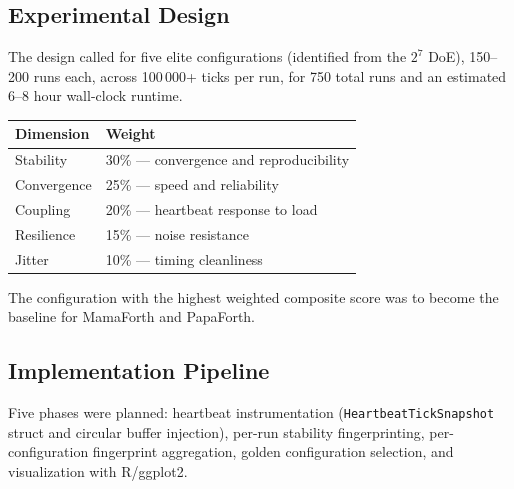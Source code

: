 \subsection{Experimental Design}

The design called for five elite configurations (identified from the
$2^7$ DoE), 150--200 runs each, across 100\,000+ ticks per run, for
750 total runs and an estimated 6--8 hour wall-clock runtime.

\begin{center}
\begin{tabular}{lp{6cm}}
\toprule
Dimension & Weight \\
\midrule
Stability   & 30\% — convergence and reproducibility \\
Convergence & 25\% — speed and reliability \\
Coupling    & 20\% — heartbeat response to load \\
Resilience  & 15\% — noise resistance \\
Jitter      & 10\% — timing cleanliness \\
\bottomrule
\end{tabular}
\end{center}

The configuration with the highest weighted composite score was to become
the baseline for MamaForth and PapaForth.

\subsection{Implementation Pipeline}

Five phases were planned: heartbeat instrumentation
(\texttt{HeartbeatTickSnapshot} struct and circular buffer injection),
per-run stability fingerprinting, per-configuration fingerprint aggregation,
golden configuration selection, and visualization with R/ggplot2.

